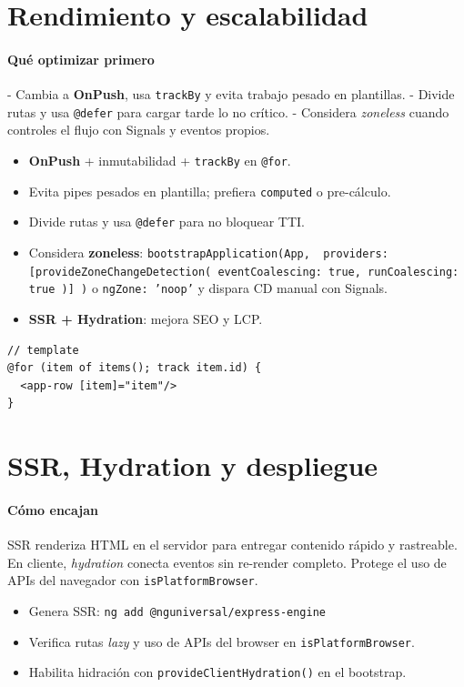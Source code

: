\documentclass[11pt,a4paper]{article}
\begin{document}
\section{Rendimiento y escalabilidad}
\paragraph{Qué optimizar primero}
- Cambia a \textbf{OnPush}, usa \texttt{trackBy} y evita trabajo pesado en plantillas.
- Divide rutas y usa \texttt{@defer} para cargar tarde lo no crítico.
- Considera \emph{zoneless} cuando controles el flujo con Signals y eventos propios.

\begin{itemize}[leftmargin=*]
  \item \textbf{OnPush} + inmutabilidad + \texttt{trackBy} en \texttt{@for}.
  \item Evita pipes pesados en plantilla; prefiera \texttt{computed} o pre-cálculo.
  \item Divide rutas y usa \texttt{@defer} para no bloquear TTI.
  \item Considera \textbf{zoneless}: \texttt{bootstrapApplication(App, { providers: [provideZoneChangeDetection({ eventCoalescing: true, runCoalescing: true })] })} o \texttt{ngZone: 'noop'} y dispara CD manual con Signals.
  \item \textbf{SSR + Hydration}: mejora SEO y LCP.
\end{itemize}

\begin{lstlisting}[style=tsstyle, caption={Lista grande con @for y trackBy}]
// template
@for (item of items(); track item.id) {
  <app-row [item]="item"/>
}
\end{lstlisting}

\section{SSR, Hydration y despliegue}
\paragraph{Cómo encajan}
SSR renderiza HTML en el servidor para entregar contenido rápido y rastreable. En cliente, \emph{hydration} conecta eventos sin re-render completo. Protege el uso de APIs del navegador con \texttt{isPlatformBrowser}.

\begin{itemize}[leftmargin=*]
  \item Genera SSR: \texttt{ng add @nguniversal/express-engine}
  \item Verifica rutas \emph{lazy} y uso de APIs del browser en \texttt{isPlatformBrowser}.
  \item Habilita hidración con \texttt{provideClientHydration()} en el bootstrap.
\end{itemize}
\end{document}
